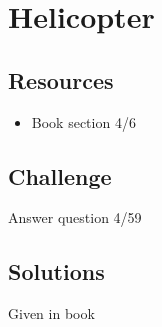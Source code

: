 \newpage
\section{Helicopter}

\subsection*{Resources}
\begin{itemize}
    \item Book section 4/6
\end{itemize}

\subsection*{Challenge}
Answer question 4/59

\subsection*{Solutions}
Given in book




%
%
%
